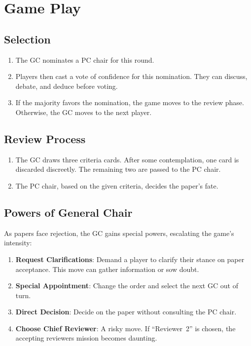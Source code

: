 \documentclass[sigplan,screen,nonacm]{acmart}
\begin{document}
\section{Game Play}

\subsection{Selection}

\begin{enumerate}
	\item The GC nominates a PC chair for this round.
	\item Players then cast a vote of confidence for this nomination. They can discuss, debate, and deduce before voting.
	\item If the majority favors the nomination, the game moves to the review phase. Otherwise, the GC moves to the next player.
\end{enumerate}

\subsection{Review Process}

\begin{enumerate}
	\item The GC draws three criteria cards. After some contemplation, one card is discarded discreetly. The remaining two are passed to the PC chair.
	\item The PC chair, based on the given criteria, decides the paper's fate.
\end{enumerate}

\subsection{Powers of General Chair}

As papers face rejection, the GC gains special powers, escalating the game's intensity:

\begin{enumerate}
	\item \textbf{Request Clarifications}: Demand a player to clarify their stance on paper acceptance. This move can gather information or sow doubt.
	\item \textbf{Special Appointment}: Change the order and select the next GC out of turn.
	\item \textbf{Direct Decision}: Decide on the paper without consulting the PC chair.
	\item \textbf{Choose Chief Reviewer}: A risky move. If ``Reviewer~2'' is chosen, the accepting reviewers mission becomes daunting.
\end{enumerate}
\end{document}
